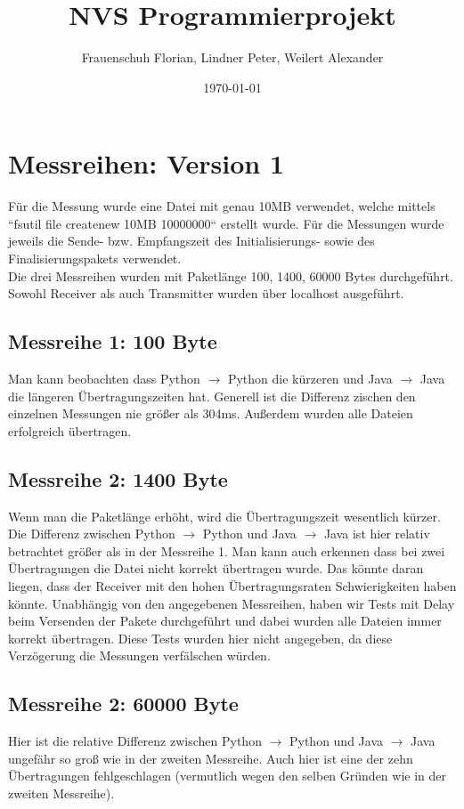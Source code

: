 \documentclass{article}
\title{NVS Programmierprojekt}
\author{Frauenschuh Florian, Lindner Peter, Weilert Alexander}
\date{\today}
\begin{document}
    \maketitle

    \section{Messreihen: Version 1}
    Für die Messung wurde eine Datei mit genau 10MB verwendet, welche mittels ``fsutil file createnew 10MB 10000000`` erstellt wurde. Für die Messungen wurde jeweils die Sende- bzw. Empfangszeit des Initialisierungs- sowie des Finalisierungspakets verwendet. \\
    Die drei Messreihen wurden mit Paketlänge 100, 1400, 60000 Bytes durchgeführt. \\
    Sowohl Receiver als auch Transmitter wurden über localhost ausgeführt.

    \subsection{Messreihe 1: 100 Byte}
    Man kann beobachten dass Python $\rightarrow$ Python die kürzeren und Java $\rightarrow$ Java die längeren Übertragungszeiten hat. Generell ist die Differenz zischen den einzelnen Messungen nie größer als 304ms. Außerdem wurden alle Dateien erfolgreich übertragen.

    \subsection{Messreihe 2: 1400 Byte}
    Wenn man die Paketlänge erhöht, wird die Übertragungszeit wesentlich kürzer. Die Differenz zwischen Python $\rightarrow$ Python und Java $\rightarrow$ Java ist hier relativ betrachtet größer als in der Messreihe 1. Man kann auch erkennen dass bei zwei Übertragungen die Datei nicht korrekt übertragen wurde. Das könnte daran liegen, dass der Receiver mit den hohen Übertragungsraten Schwierigkeiten haben könnte. Unabhängig von den angegebenen Messreihen, haben wir Tests mit Delay beim Versenden der Pakete durchgeführt und dabei wurden alle Dateien immer korrekt übertragen. Diese Tests wurden hier nicht angegeben, da diese Verzögerung die Messungen verfälschen würden.

    \subsection{Messreihe 2: 60000 Byte}
    Hier ist die relative Differenz zwischen Python $\rightarrow$ Python und Java $\rightarrow$ Java ungefähr so groß wie in der zweiten Messreihe. Auch hier ist eine der zehn Übertragungen fehlgeschlagen (vermutlich wegen den selben Gründen wie in der zweiten Messreihe).
\end{document}
